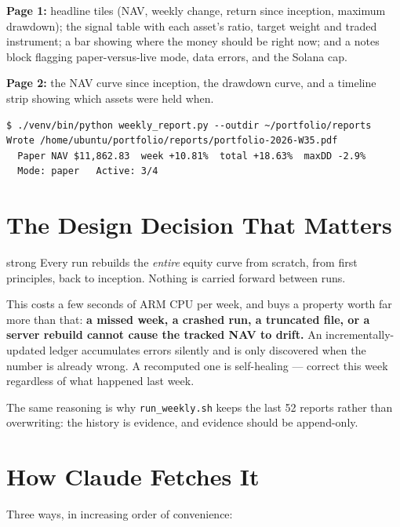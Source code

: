\documentclass[11pt,a4paper]{article}
\begin{document}
\textbf{Page 1:} headline tiles (NAV, weekly change, return since
inception, maximum drawdown); the signal table with each asset's ratio,
target weight and traded instrument; a bar showing where the money
should be right now; and a notes block flagging paper-versus-live mode,
data errors, and the Solana cap.

\textbf{Page 2:} the NAV curve since inception, the drawdown curve, and
a timeline strip showing which assets were held when.

\begin{codebox}
\begin{lstlisting}[style=shell]
$ ./venv/bin/python weekly_report.py --outdir ~/portfolio/reports
Wrote /home/ubuntu/portfolio/reports/portfolio-2026-W35.pdf
  Paper NAV $11,862.83  week +10.81%  total +18.63%  maxDD -2.9%
  Mode: paper   Active: 3/4
\end{lstlisting}
\end{codebox}

\section{The Design Decision That Matters}

\begin{resultbox}{strong}
Every run rebuilds the \emph{entire} equity curve from scratch, from
first principles, back to inception. Nothing is carried forward
between runs.

This costs a few seconds of ARM CPU per week, and buys a property
worth far more than that: \textbf{a missed week, a crashed run, a
truncated file, or a server rebuild cannot cause the tracked NAV to
drift.} An incrementally-updated ledger accumulates errors silently
and is only discovered when the number is already wrong. A recomputed
one is self-healing --- correct this week regardless of what happened
last week.

The same reasoning is why \texttt{run\_weekly.sh} keeps the last 52
reports rather than overwriting: the history is evidence, and
evidence should be append-only.
\end{resultbox}

\section{How Claude Fetches It}

Three ways, in increasing order of convenience:
\end{document}
